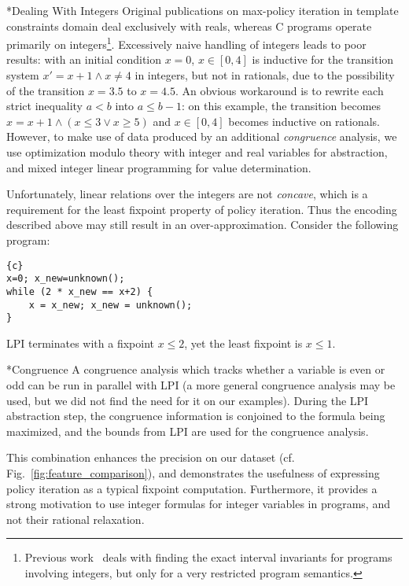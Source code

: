 \documentclass{llncs}
\makeatletter
\renewcommand{\paragraph}{\@startsection{paragraph}{4}{\z@}{0.8ex \@plus 0ex \@minus 1ex}{-1em}{\normalfont\normalsize\bfseries}}
\makeatother
\begin{document}
\paragraph*{Dealing With Integers}
Original publications on max-policy iteration in template constraints domain
deal exclusively with reals,
whereas C programs operate primarily on integers\footnote{Previous work~\cite{max_strategy_intervals_integers} deals with finding the exact
interval invariants for programs involving integers, but only for a very
restricted program semantics.}.
Excessively naive handling of integers leads to poor results:
with an initial condition $x=0$,
$x \in [0, 4]$ is inductive for the transition system
$x' = x + 1 \land x \neq 4$ in integers, but not
in rationals, due to the possibility of the transition $x=3.5$ to $x=4.5$.
An obvious workaround is to rewrite each strict inequality $a < b$ into $a \leq
b-1$: on this example, the transition becomes $x = x+1 \land (x \leq 3 \lor x
\geq 5)$ and $x \in [0, 4]$ becomes inductive on rationals.
However, to make use of data produced by an additional \emph{congruence} analysis,
we use optimization modulo theory with integer and real
variables  for abstraction, and mixed integer linear
programming for value determination.

Unfortunately, linear relations over the integers are not \emph{concave}, which is
a requirement for the least fixpoint property of policy iteration.
Thus the encoding described above may still result in an over-approximation.
Consider the following program:
\begin{small}
\begin{lstlisting}{c}
x=0; x_new=unknown();
while (2 * x_new == x+2) {
    x = x_new; x_new = unknown();
}
\end{lstlisting}
\end{small}
LPI terminates with a fixpoint $x \leq 2$, yet the least fixpoint is $x \leq 1$.

\paragraph*{Congruence}
A congruence analysis which tracks
whether a variable is even or odd can be run in parallel with LPI
(a more general congruence analysis may be used, but we did not find the need for it on our examples).
During the LPI abstraction step, the congruence information is conjoined to the formula being maximized,
and the bounds from LPI are used for the congruence analysis.

This combination enhances the precision on our dataset
(cf. Fig.~\ref{fig:feature_comparison}), and demonstrates the usefulness of
expressing policy iteration as a typical fixpoint computation.
Furthermore, it provides a strong motivation to use integer formulas for
integer variables in programs, and not their rational relaxation.
\end{document}
